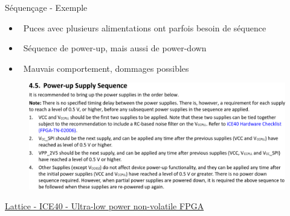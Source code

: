 \begin{frame}{Séquençage - Exemple}
    \begin{itemize}
        \item[] \textcolor{UDSgreenFierte}{\faList} ~Puces avec plusieurs alimentations ont parfois besoin de séquence
        \item[] \textcolor{UDSgreenFierte}{\faLevelDown*} ~Séquence de power-up, mais aussi de power-down
        \item[] \textcolor{red}{\faBurn} ~Mauvais comportement, dommages possibles
    \end{itemize}

    \vfill
    \begin{figure}
        \includegraphics[width=\textwidth, height=0.55\textheight, keepaspectratio]{pictures/ice40-power-supply-sequence.png}
    \end{figure}
    \href{https://www.latticesemi.com/view_document?document_id=49312}{Lattice - ICE40 - Ultra-low power non-volatile FPGA}
\end{frame}

